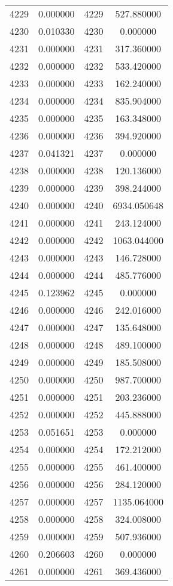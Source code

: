 \documentclass[12pt]{article}
\begin{document}
\begin{longtable}{@{}cccc@{}}
4229 & 0.000000 & 4229 & 527.880000 \\
4230 & 0.010330 & 4230 & 0.000000 \\
4231 & 0.000000 & 4231 & 317.360000 \\
4232 & 0.000000 & 4232 & 533.420000 \\
4233 & 0.000000 & 4233 & 162.240000 \\
4234 & 0.000000 & 4234 & 835.904000 \\
4235 & 0.000000 & 4235 & 163.348000 \\
4236 & 0.000000 & 4236 & 394.920000 \\
4237 & 0.041321 & 4237 & 0.000000 \\
4238 & 0.000000 & 4238 & 120.136000 \\
4239 & 0.000000 & 4239 & 398.244000 \\
4240 & 0.000000 & 4240 & 6934.050648 \\
4241 & 0.000000 & 4241 & 243.124000 \\
4242 & 0.000000 & 4242 & 1063.044000 \\
4243 & 0.000000 & 4243 & 146.728000 \\
4244 & 0.000000 & 4244 & 485.776000 \\
4245 & 0.123962 & 4245 & 0.000000 \\
4246 & 0.000000 & 4246 & 242.016000 \\
4247 & 0.000000 & 4247 & 135.648000 \\
4248 & 0.000000 & 4248 & 489.100000 \\
4249 & 0.000000 & 4249 & 185.508000 \\
4250 & 0.000000 & 4250 & 987.700000 \\
4251 & 0.000000 & 4251 & 203.236000 \\
4252 & 0.000000 & 4252 & 445.888000 \\
4253 & 0.051651 & 4253 & 0.000000 \\
4254 & 0.000000 & 4254 & 172.212000 \\
4255 & 0.000000 & 4255 & 461.400000 \\
4256 & 0.000000 & 4256 & 284.120000 \\
4257 & 0.000000 & 4257 & 1135.064000 \\
4258 & 0.000000 & 4258 & 324.008000 \\
4259 & 0.000000 & 4259 & 507.936000 \\
4260 & 0.206603 & 4260 & 0.000000 \\
4261 & 0.000000 & 4261 & 369.436000 \\

\end{longtable}
\end{document}
